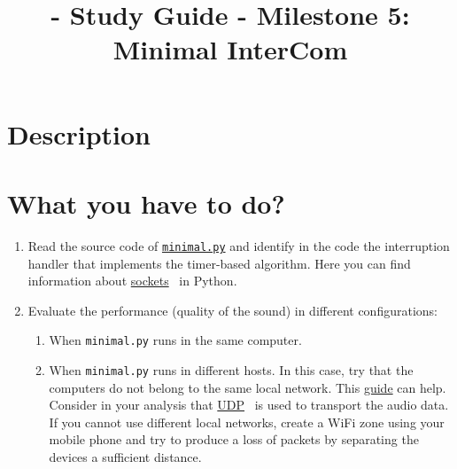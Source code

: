 
\title{\TM{} - Study Guide - Milestone 5: Minimal InterCom}

\maketitle

\section{Description}


\section{What you have to do?}

\begin{enumerate}

\item Read the source code of
  \href{https://github.com/Tecnologias-multimedia/intercom/blob/master/src/minimal.py}{\texttt{minimal.py}}
  and identify in the code the interruption handler that implements
  the timer-based algorithm. Here you can find information about
  \href{https://github.com/vicente-gonzalez-ruiz/YAPT/blob/master/03-IO/networking/sockets.ipynb}{sockets}~\cite{YAPT} in Python.
  
\item Evaluate the performance (quality of the sound) in different configurations:
  \begin{enumerate}
  \item When \verb|minimal.py| runs in the same computer.
  \item When \verb|minimal.py| runs in different hosts. In this case,
    try that the computers do not belong to the same local
    network. This
    \href{https://www.noip.com/support/knowledgebase/general-port-forwarding-guide/}{guide}
    can help. Consider in your analysis that
    \href{https://en.wikipedia.org/wiki/User_Datagram_Protocol}{UDP}~\cite{UDP}
    is used to transport the audio data. If you cannot use different
    local networks, create a WiFi zone using your mobile phone and try
    to produce a loss of packets by separating the devices a
    sufficient distance.
  \end{enumerate}
   
  
\end{enumerate}

